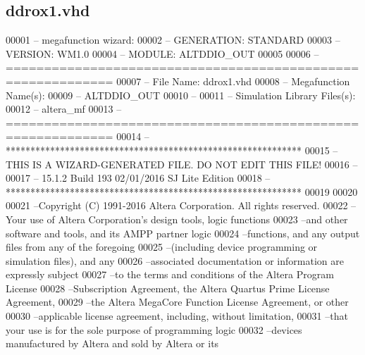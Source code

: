 \subsection{ddrox1.\+vhd}
\label{ddrox1_8vhd_source}

\begin{DoxyCode}
00001 \textcolor{keyword}{-- megafunction wizard: %
00002 \textcolor{keyword}{-- GENERATION: STANDARD}
00003 \textcolor{keyword}{-- VERSION: WM1.0}
00004 \textcolor{keyword}{-- MODULE: ALTDDIO\_OUT }
00005 
00006 \textcolor{keyword}{-- ============================================================}
00007 \textcolor{keyword}{-- File Name: ddrox1.vhd}
00008 \textcolor{keyword}{-- Megafunction Name(s):}
00009 \textcolor{keyword}{--          ALTDDIO\_OUT}
00010 \textcolor{keyword}{--}
00011 \textcolor{keyword}{-- Simulation Library Files(s):}
00012 \textcolor{keyword}{--          altera\_mf}
00013 \textcolor{keyword}{-- ============================================================}
00014 \textcolor{keyword}{-- ************************************************************}
00015 \textcolor{keyword}{-- THIS IS A WIZARD-GENERATED FILE. DO NOT EDIT THIS FILE!}
00016 \textcolor{keyword}{--}
00017 \textcolor{keyword}{-- 15.1.2 Build 193 02/01/2016 SJ Lite Edition}
00018 \textcolor{keyword}{-- ************************************************************}
00019 
00020 
00021 \textcolor{keyword}{--Copyright (C) 1991-2016 Altera Corporation. All rights reserved.}
00022 \textcolor{keyword}{--Your use of Altera Corporation's design tools, logic functions }
00023 \textcolor{keyword}{--and other software and tools, and its AMPP partner logic }
00024 \textcolor{keyword}{--functions, and any output files from any of the foregoing }
00025 \textcolor{keyword}{--(including device programming or simulation files), and any }
00026 \textcolor{keyword}{--associated documentation or information are expressly subject }
00027 \textcolor{keyword}{--to the terms and conditions of the Altera Program License }
00028 \textcolor{keyword}{--Subscription Agreement, the Altera Quartus Prime License Agreement,}
00029 \textcolor{keyword}{--the Altera MegaCore Function License Agreement, or other }
00030 \textcolor{keyword}{--applicable license agreement, including, without limitation, }
00031 \textcolor{keyword}{--that your use is for the sole purpose of programming logic }
00032 \textcolor{keyword}{--devices manufactured by Altera and sold by Altera or its }
}
\end{DoxyCode}
